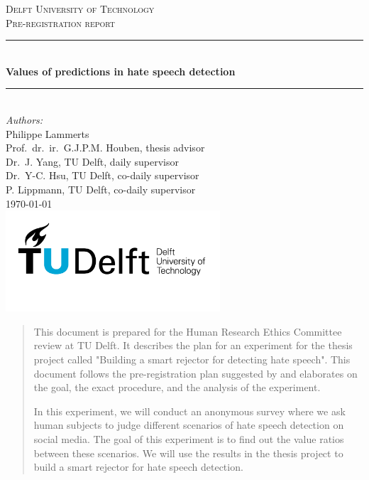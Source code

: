 \documentclass[a4paper]{article}
\begin{document}
\begin{titlepage}

    \newcommand{\HRule}{\rule{\linewidth}{0.5mm}} 							%
    \center

    \textsc{\LARGE Delft University of Technology}\\[1cm]

    \textsc{\Large Pre-registration report}\\[0.2cm]
    \HRule \\[0.8cm]
    { \huge \bfseries Values of predictions in hate speech detection}\\[0.7cm]								%
    \HRule \\[2cm]
    \large
    \emph{Authors:}\\
    Philippe Lammerts\\
    Prof.\ dr.\ ir.\ G.J.P.M. Houben, thesis advisor \\
    Dr.\ J. Yang, TU Delft, daily supervisor \\
    Dr.\ Y-C. Hsu, TU Delft, co-daily supervisor\\
    P. Lippmann, TU Delft, co-daily supervisor\\

    {\large \today}\\[5cm]
    \includegraphics[width=0.6\textwidth]{images/TU_delft_logo.jpg}\\[1cm] 	%
    \vfill
\end{titlepage}

\begin{abstract}
    This document is prepared for the Human Research Ethics Committee review at TU Delft. It describes the plan for an experiment for the thesis project called "Building a smart rejector for detecting hate speech". This document follows the pre-registration plan suggested by \cite{van2016pre} and elaborates on the goal, the exact procedure, and the analysis of the experiment.

    In this experiment, we will conduct an anonymous survey where we ask human subjects to judge different scenarios of hate speech detection on social media. The goal of this experiment is to find out the value ratios between these scenarios. We will use the results in the thesis project to build a smart rejector for hate speech detection.
\end{abstract}
\end{document}
